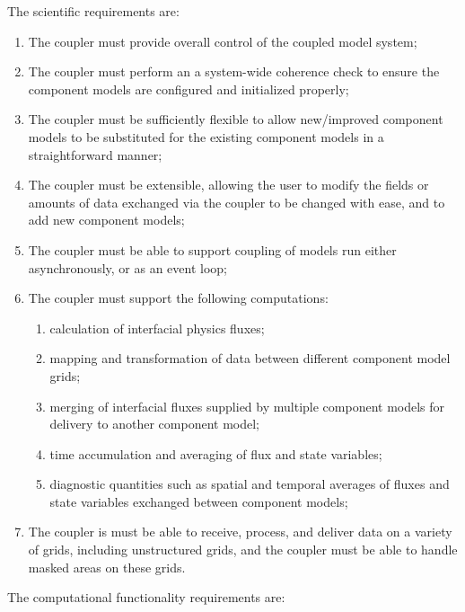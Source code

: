 \documentclass{article}
\begin{document}
The scientific requirements are:
\begin{enumerate}
\item The coupler must provide overall control of the coupled
model system;
\item The coupler must perform an a system-wide coherence check to
ensure the component models are configured and initialized
properly;
\item The coupler must be sufficiently flexible to allow new/improved 
component models to be substituted for the existing component models in a
straightforward manner;
\item The coupler must be extensible, allowing the user to modify
the fields or amounts of data exchanged via the coupler to be
changed with ease, and to add new component models;
\item The coupler must be able to support coupling of models run
either asynchronously, or as an event loop;
\item The coupler must support the following computations:
\begin{enumerate}
\item calculation of interfacial physics fluxes;
\item mapping and transformation of data between different
component model grids;
\item merging of interfacial fluxes supplied by multiple component
models for delivery to another component model;
\item time accumulation and averaging of flux and state
variables;
\item diagnostic quantities such as spatial and temporal averages
of fluxes and state variables exchanged between component models;
\end{enumerate}
\item The coupler is must be able to receive, process, and deliver
data on a variety of grids, including unstructured grids, and the
coupler must be able to handle masked areas on these grids.
\end{enumerate}

The computational functionality requirements are:
\end{document}
